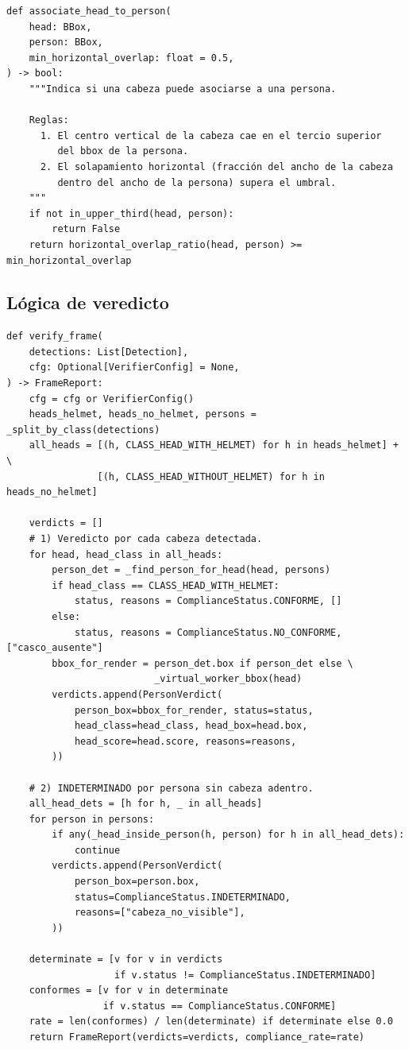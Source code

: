 \documentclass[journal,onecolumn,11pt]{IEEEtran}
\begin{document}
\begin{lstlisting}[caption={Asociación cabeza-persona: tercio superior
+ solapamiento horizontal.}]
def associate_head_to_person(
    head: BBox,
    person: BBox,
    min_horizontal_overlap: float = 0.5,
) -> bool:
    """Indica si una cabeza puede asociarse a una persona.

    Reglas:
      1. El centro vertical de la cabeza cae en el tercio superior
         del bbox de la persona.
      2. El solapamiento horizontal (fracción del ancho de la cabeza
         dentro del ancho de la persona) supera el umbral.
    """
    if not in_upper_third(head, person):
        return False
    return horizontal_overlap_ratio(head, person) >= min_horizontal_overlap
\end{lstlisting}

\subsection{Lógica de veredicto}

\begin{lstlisting}[caption={Función principal \texttt{verify\_frame()}
del verificador (versión solo-casco).}]
def verify_frame(
    detections: List[Detection],
    cfg: Optional[VerifierConfig] = None,
) -> FrameReport:
    cfg = cfg or VerifierConfig()
    heads_helmet, heads_no_helmet, persons = _split_by_class(detections)
    all_heads = [(h, CLASS_HEAD_WITH_HELMET) for h in heads_helmet] + \
                [(h, CLASS_HEAD_WITHOUT_HELMET) for h in heads_no_helmet]

    verdicts = []
    # 1) Veredicto por cada cabeza detectada.
    for head, head_class in all_heads:
        person_det = _find_person_for_head(head, persons)
        if head_class == CLASS_HEAD_WITH_HELMET:
            status, reasons = ComplianceStatus.CONFORME, []
        else:
            status, reasons = ComplianceStatus.NO_CONFORME, ["casco_ausente"]
        bbox_for_render = person_det.box if person_det else \
                          _virtual_worker_bbox(head)
        verdicts.append(PersonVerdict(
            person_box=bbox_for_render, status=status,
            head_class=head_class, head_box=head.box,
            head_score=head.score, reasons=reasons,
        ))

    # 2) INDETERMINADO por persona sin cabeza adentro.
    all_head_dets = [h for h, _ in all_heads]
    for person in persons:
        if any(_head_inside_person(h, person) for h in all_head_dets):
            continue
        verdicts.append(PersonVerdict(
            person_box=person.box,
            status=ComplianceStatus.INDETERMINADO,
            reasons=["cabeza_no_visible"],
        ))

    determinate = [v for v in verdicts
                   if v.status != ComplianceStatus.INDETERMINADO]
    conformes = [v for v in determinate
                 if v.status == ComplianceStatus.CONFORME]
    rate = len(conformes) / len(determinate) if determinate else 0.0
    return FrameReport(verdicts=verdicts, compliance_rate=rate)
\end{lstlisting}
\end{document}
